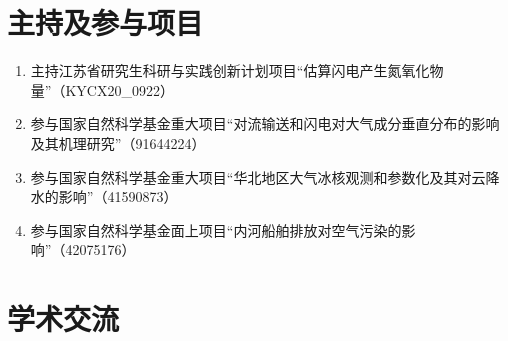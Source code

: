 \clearpage

\specialsectioning
\section{主持及参与项目}

\begin{enumerate}[label={(\arabic*)}, leftmargin=20pt, widest=0, itemindent=*, topsep=0pt, partopsep=0pt, parsep=0pt]

\item 主持江苏省研究生科研与实践创新计划项目“估算闪电产生氮氧化物量”（KYCX20\_0922） %

\item 参与国家自然科学基金重大项目“对流输送和闪电对大气成分垂直分布的影响及其机理研究”（91644224） %

\item 参与国家自然科学基金重大项目“华北地区大气冰核观测和参数化及其对云降水的影响”（41590873）%

\item 参与国家自然科学基金面上项目“内河船舶排放对空气污染的影响”（42075176） %

\end{enumerate}

\specialsectioning
\section{学术交流}


